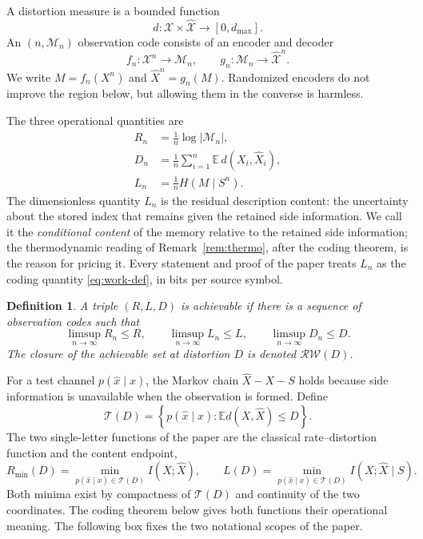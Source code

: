 \documentclass[11pt,onecolumn]{IEEEtran}
\newtheorem{definition}[theorem]{Definition}
\newcommand{\E}{\mathbb{E}}
\newcommand{\cX}{\mathcal{X}}
\newcommand{\hX}{\widehat{X}}
\newcommand{\hXn}{\widehat{X}^{n}}
\newcommand{\RW}{\mathcal{R}\!\mathcal{W}}
\begin{document}
A distortion measure is a bounded function
\begin{equation}
 d:\cX\times\widehat{\cX}\longrightarrow[0,d_{\max}].
\end{equation}
An $(n,\mathcal M_n)$ observation code consists of an encoder and decoder
\begin{equation}
 f_n:\cX^n\to\mathcal M_n,
 \qquad
 g_n:\mathcal M_n\to\widehat{\cX}^{n}.
\end{equation}
We write $M=f_n(X^n)$ and $\hXn=g_n(M)$. Randomized encoders do not improve
the region below, but allowing them in the converse is harmless.

The three operational quantities are
\begin{align}
 R_n&=\frac{1}{n}\log |\mathcal M_n|,\label{eq:rate-def}\\
 D_n&=\frac{1}{n}\sum_{i=1}^{n}\E\,d(X_i,\hX_i),\label{eq:dist-def}\\
 L_n&=\frac{1}{n}H(M\mid S^n).\label{eq:work-def}
\end{align}
The dimensionless quantity $L_n$ is the residual description content: the
uncertainty about the stored index that remains given the retained side
information. We call it the \emph{conditional content} of the memory relative
to the retained side information; the thermodynamic reading of
Remark~\ref{rem:thermo}, after the coding theorem, is the reason for
pricing it. Every statement and proof of the paper treats $L_n$ as
the coding quantity \eqref{eq:work-def}, in bits per source symbol.

\begin{definition}\label{def:achievability}
A triple $(R,L,D)$ is achievable if there is a sequence of observation codes
such that
\begin{equation}
 \limsup_{n\to\infty}R_n\le R,\qquad
 \limsup_{n\to\infty}L_n\le L,\qquad
 \limsup_{n\to\infty}D_n\le D.
\end{equation}
The closure of the achievable set at distortion $D$ is denoted $\RW(D)$.
\end{definition}

For a test channel $p(\hat x\mid x)$, the Markov chain $\hX-X-S$ holds
because side information is unavailable when the observation is formed.
Define
\begin{equation}
 \mathcal T(D)
 =\left\{p(\hat x\mid x):\E d(X,\hX)\le D\right\}.
\end{equation}
The two single-letter functions of the paper are the classical
rate--distortion function and the content endpoint,
\begin{equation}
 R_{\min}(D)=\min_{p(\hat x\mid x)\in\mathcal T(D)}I(X;\hX),
 \qquad
 L(D)=\min_{p(\hat x\mid x)\in\mathcal T(D)}I(X;\hX\mid S).
 \label{eq:work-endpoint}
\end{equation}
Both minima exist by compactness of $\mathcal T(D)$ and continuity of the
two coordinates. The coding theorem below gives both functions their
operational meaning. The following box fixes the two notational scopes of
the paper.
\end{document}
